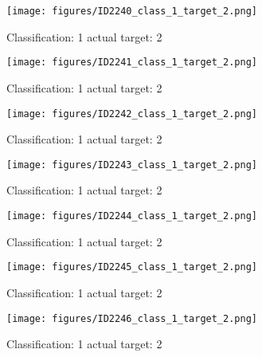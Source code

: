 \begin{figure}[h!]
\begin{center}
\texttt{[image: figures/ID2240\_class\_1\_target\_2.png]}
\end{center}
\caption{ Classification: 1 actual target: 2}
\label{fig:ID2240_class_1_target_2}
\end{figure}
\begin{figure}[h!]
\begin{center}
\texttt{[image: figures/ID2241\_class\_1\_target\_2.png]}
\end{center}
\caption{ Classification: 1 actual target: 2}
\label{fig:ID2241_class_1_target_2}
\end{figure}
\begin{figure}[h!]
\begin{center}
\texttt{[image: figures/ID2242\_class\_1\_target\_2.png]}
\end{center}
\caption{ Classification: 1 actual target: 2}
\label{fig:ID2242_class_1_target_2}
\end{figure}
\begin{figure}[h!]
\begin{center}
\texttt{[image: figures/ID2243\_class\_1\_target\_2.png]}
\end{center}
\caption{ Classification: 1 actual target: 2}
\label{fig:ID2243_class_1_target_2}
\end{figure}
\begin{figure}[h!]
\begin{center}
\texttt{[image: figures/ID2244\_class\_1\_target\_2.png]}
\end{center}
\caption{ Classification: 1 actual target: 2}
\label{fig:ID2244_class_1_target_2}
\end{figure}
\begin{figure}[h!]
\begin{center}
\texttt{[image: figures/ID2245\_class\_1\_target\_2.png]}
\end{center}
\caption{ Classification: 1 actual target: 2}
\label{fig:ID2245_class_1_target_2}
\end{figure}
\begin{figure}[h!]
\begin{center}
\texttt{[image: figures/ID2246\_class\_1\_target\_2.png]}
\end{center}
\caption{ Classification: 1 actual target: 2}
\label{fig:ID2246_class_1_target_2}
\end{figure}
